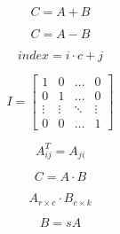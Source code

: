 \documentclass{article}
\begin{document}
\[C = A + B
\]
\pagebreak

\[C = A - B
\]
\pagebreak

\[index = i \cdot c + j
\]
\pagebreak

\[I =
\begin{bmatrix}
1 & 0 & \dots & 0 \\
0 & 1 & \dots & 0 \\
\vdots & \vdots & \ddots & \vdots \\
0 & 0 & \dots & 1
\end{bmatrix}
\]
\pagebreak

\[A^T_{ij} = A_{ji}
\]
\pagebreak

\[C = A \cdot B
\]
\pagebreak

\[A_{r \times c} \cdot B_{c \times k}
\]
\pagebreak

\[B = sA
\]
\pagebreak
\end{document}
